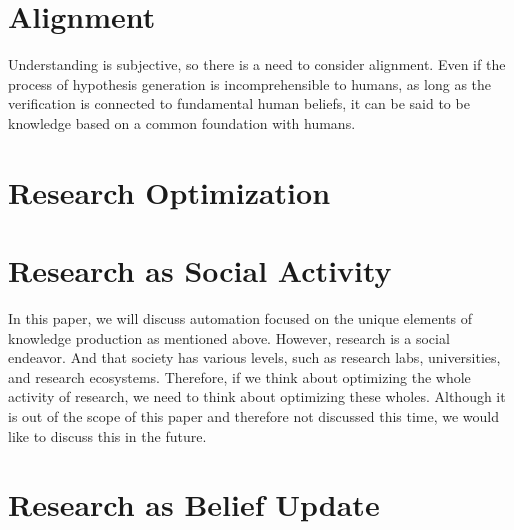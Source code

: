 \documentclass{book}
\begin{document}
\chapter{Alignment}
Understanding is subjective, so there is a need to consider alignment. Even if the process of hypothesis generation is incomprehensible to humans, as long as the verification is connected to fundamental human beliefs, it can be said to be knowledge based on a common foundation with humans.

\chapter{Research Optimization}

\chapter{Research as Social Activity}
In this paper, we will discuss automation focused on the unique elements of knowledge production as mentioned above. However, research is a social endeavor. And that society has various levels, such as research labs, universities, and research ecosystems. Therefore, if we think about optimizing the whole activity of research, we need to think about optimizing these wholes. Although it is out of the scope of this paper and therefore not discussed this time, we would like to discuss this in the future.

\chapter{Research as Belief Update}
\end{document}
